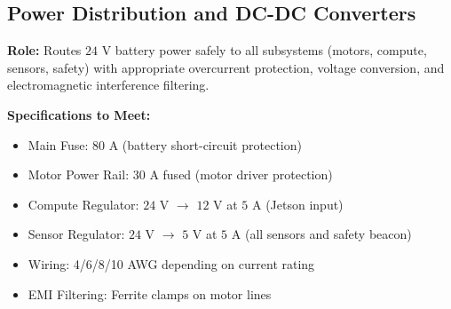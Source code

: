 \documentclass[12pt,a4paper]{article}
\begin{document}
\subsection{Power Distribution and DC-DC Converters}

\textbf{Role:} Routes $24$ V battery power safely to all subsystems (motors, compute, sensors, safety) with appropriate overcurrent protection, voltage conversion, and electromagnetic interference filtering.

\textbf{Specifications to Meet:}
\begin{itemize}
\item Main Fuse: $80$ A (battery short-circuit protection)
\item Motor Power Rail: $30$ A fused (motor driver protection)
\item Compute Regulator: $24$ V $\rightarrow$ $12$ V at $5$ A (Jetson input)
\item Sensor Regulator: $24$ V $\rightarrow$ $5$ V at $5$ A (all sensors and safety beacon)
\item Wiring: 4/6/8/10 AWG depending on current rating
\item EMI Filtering: Ferrite clamps on motor lines
\end{itemize}
\end{document}
